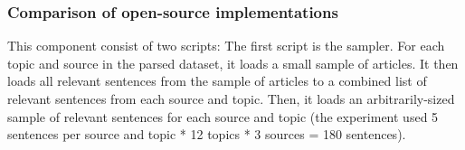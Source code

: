 \documentclass{report}
\begin{document}
\subsubsection{Comparison of open-source implementations} \label{des-sentiment-comparison}

This component consist of two scripts:
The first script is the sampler.
For each topic and source in the parsed dataset, it loads a small sample of articles.
It then loads all relevant sentences from the sample of articles to a combined list of relevant sentences from each source and topic.
Then, it loads an arbitrarily-sized sample of relevant sentences for each source and topic (the experiment used 5 sentences per source and topic * 12 topics * 3 sources = 180 sentences).
\end{document}
